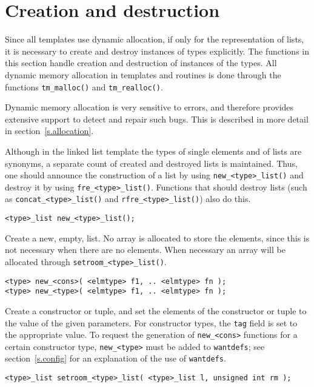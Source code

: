 \section{Creation and destruction}
Since all templates use dynamic allocation, if only for the representation
of lists,
it is necessary to create and destroy instances of {\Tm} types explicitly.
The functions in this section handle creation and destruction of instances of
the {\Tm} types.
All dynamic memory allocation in {\Tm} templates and routines is done through
the functions \verb+tm_malloc()+ and \verb+tm_realloc()+.
\par
Dynamic memory allocation is very sensitive to errors,
and therefore {\Tm} provides extensive support to detect and repair such
bugs.
This is described in more detail in section~\ref{s.allocation}.
\par
Although in the linked list template the types of single elements
and of lists are synonyms,
a separate count of created and destroyed lists is maintained.
Thus,
one should announce the construction of a list
by using \verb+new_<type>_list()+ and destroy it by using
\verb+fre_<type>_list()+.
Functions that should destroy lists (such as \verb+concat_<type>_list()+
and \verb+rfre_<type>_list()+) also do this.
\begin{verbatim}
<type>_list new_<type>_list();
\end{verbatim}
\begin{desc}
Create a new, empty, list.
No array is allocated to store the elements,
since this is not necessary when there are no elements.
When necessary an array will be allocated through \verb+setroom_<type>_list()+.
\end{desc}
\begin{verbatim}
<type> new_<cons>( <elmtype> f1, .. <elmtype> fn );
<type> new_<type>( <elmtype> f1, .. <elmtype> fn );
\end{verbatim}
\begin{desc}
Create a constructor or tuple,
and set the
elements of the constructor or tuple to the value of the given parameters.
For constructor types, the {\tt tag} field is set to the appropriate
value.
To request the generation of {\tt new\_<cons>} functions for a certain
constructor type,
{\tt new\_<type>} must be added to {\tt wantdefs};
see section~\ref{s.config} for an explanation of the use of {\tt wantdefs}.
\end{desc}
\begin{verbatim}
<type>_list setroom_<type>_list( <type>_list l, unsigned int rm );
\end{verbatim}
